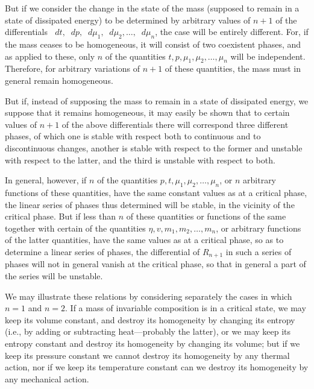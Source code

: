 \documentclass[11pt]{article}
\newcommand{\dd}{\mathop{}\!d}
\begin{document}
But if we consider the change in the state of the mass (supposed to remain in a state of dissipated energy) to be determined by arbitrary values of $n+1$ of the differentials $\dd t,\dd p,\dd\mu_1,\dd\mu_2,\ldots,\dd\mu_n$, the case will be entirely different. For, if the mass ceases to be homogeneous, it will consist of two coexistent phases, and as applied to these, only $n$ of the quantities $t,p,\mu_1,\mu_2,\ldots,\mu_n$ will be independent. Therefore, for arbitrary variations of $n+1$ of these quantities, the mass must in general remain homogeneous.

But if, instead of supposing the mass to remain in a state of dissipated energy, we suppose that it remains homogeneous, it may easily be shown that to certain values of $n+1$ of the above differentials there will correspond three different phases, of which one is stable with respect both to continuous and to discontinuous changes, another is stable with respect to the former and unstable with respect to the latter, and the third is unstable with respect to both.

In general, however, if $n$ of the quantities $p,t,\mu_1,\mu_2,\ldots,\mu_n$, or $n$ arbitrary functions of these quantities, have the same constant values as at a critical phase, the linear series of phases thus determined will be stable, in the vicinity of the critical phase. But if less than $n$ of these quantities or functions of the same together with certain of the quantities $\eta,v,m_1,m_2,\ldots,m_n$, or arbitrary functions of the latter quantities, have the same values as at a critical phase, so as to determine a linear series of phases, the differential of $R_{n+1}$ in such a series of phases will not in general vanish at the critical phase, so that in general a part of the series will be unstable.

We may illustrate these relations by considering separately the cases in which $n=1$ and $n=2$. If a mass of invariable composition is in a critical state, we may keep its volume constant, and destroy its homogeneity by changing its entropy (i.e., by adding or subtracting heat---probably the latter), or we may keep its entropy constant and destroy its homogeneity by changing its volume; but if we keep its pressure constant we cannot destroy its homogeneity by any thermal action, nor if we keep its temperature constant can we destroy its homogeneity by any mechanical action.
\end{document}
